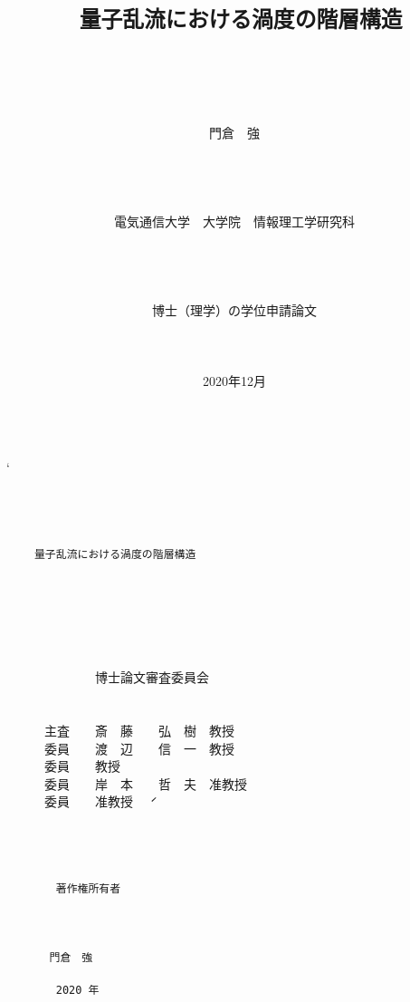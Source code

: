 \documentclass[12pt,a4paper]{jbook}
\title{
{\huge \tt
量子乱流における渦度の階層構造} \\
}
\author{
\\
\\
\\
\\
\LARGE 門倉　強
\\
\\
\\
\\
\\
\LARGE 電気通信大学　大学院　情報理工学研究科
\\
\\
\\
\\
\\
\LARGE 博士（理学）の学位申請論文
\\
\\
\\
\\
\Large 2020年12月
\\
\\
}
\begin{document}
\maketitle


\makeatletter
\def\ps@fancy{%
\def\chaptermark##1{\markboth{\ifnum \c@secnumdepth>\z@ \thechapter\hskip 0.5em\relax \fi ##1}{}}%
\def\sectionmark##1{\markright {\ifnum \c@secnumdepth >\@ne \thesection\hskip 0.5em\relax \fi ##1}}%
\ps@@fancy
\gdef\ps@fancy{\@fancyplainfalse\ps@@fancy}%
\ifdim\headwidth<0sp
\global\advance\headwidth123456789sp\global\advance\headwidth\textwidth
\fi
}
\makeatother

\newpage
` 
\\
\\
\\
\\
\\
{\huge \tt
　　量子乱流における渦度の階層構造
}
\\
\\
\\
\\
\\
\\
\\
\LARGE 　　　　　　　博士論文審査委員会
\\
\\
\\
　　　主査　　斎　藤　　弘　樹　教授
\\
　　　委員　　渡　辺　　信　一　教授
\\
　　　委員　　教授
\\
　　　委員　　岸　本　　哲　夫　准教授
\\
　　　委員　　准教授
\newpage
\'　
\\
\\
\\
\\
\\
{\huge \tt
　　　　著作権所有者
\\
\\
\\
\\
　　　　門倉　強
\\
\\
　　　　 2020 年
}
\newpage
\normalsize
\pagestyle{fancy} %
\tableofcontents
\end{document}
